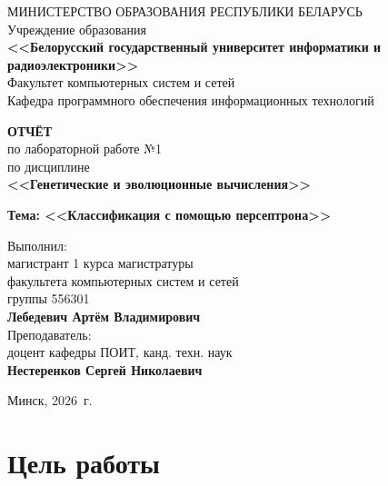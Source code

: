 \documentclass[14pt,a4paper]{extarticle}
\begin{document}
\thispagestyle{empty}

\begin{center}
МИНИСТЕРСТВО ОБРАЗОВАНИЯ РЕСПУБЛИКИ БЕЛАРУСЬ\\[0.5em]
Учреждение образования\\[0.5em]
\textbf{<<Белорусский государственный университет информатики и радиоэлектроники>>}\\[2em]

Факультет компьютерных систем и сетей\\[0.5em]
Кафедра программного обеспечения информационных технологий
\end{center}

\vspace{3em}

\begin{center}
\textbf{ОТЧЁТ}\\[0.5em]
по лабораторной работе №1\\[0.5em]
по дисциплине\\[0.5em]
\textbf{<<Генетические и эволюционные вычисления>>}

\textbf{Тема: <<Классификация с помощью персептрона>>}
\end{center}

\vspace{4em}

\hfill\begin{minipage}{0.55\textwidth}
Выполнил:\\
магистрант 1 курса магистратуры\\
факультета компьютерных систем и сетей\\
группы 556301\\[0.3em]
\textbf{Лебедевич Артём Владимирович}\\[1.2em]
Преподаватель:\\
доцент кафедры ПОИТ, канд. техн. наук\\
\textbf{Нестеренков Сергей Николаевич}
\end{minipage}

\vfill

\begin{center}
Минск, 2026~г.
\end{center}

\newpage

\tableofcontents

\newpage

\section{Цель работы}
\end{document}

